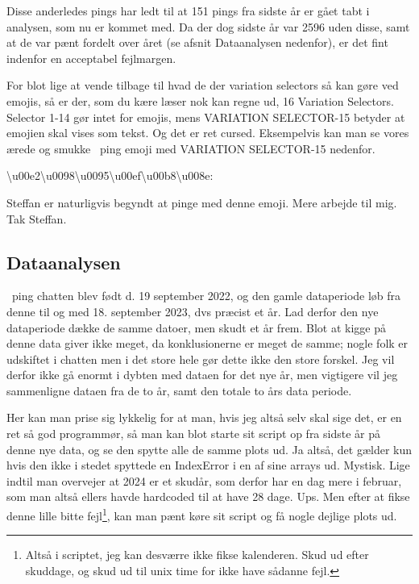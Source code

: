 \begin{article}
Disse anderledes pings har ledt til at 151 pings fra sidste år er gået tabt i analysen, som nu er kommet med. Da der dog sidste år var 2596 uden disse, samt at de var pænt fordelt over året (se afsnit Dataanalysen nedenfor), er det fint indenfor en acceptabel fejlmargen.

For blot lige at vende tilbage til hvad de der variation selectors så kan gøre ved emojis, så er der, som du kære læser nok kan regne ud, 16 Variation Selectors. Selector 1-14 gør intet for emojis, mens VARIATION SELECTOR-15 betyder at emojien skal vises som tekst. Og det er ret cursed. Eksempelvis kan man se vores ærede og smukke \coffee\ ping emoji med VARIATION SELECTOR-15 nedenfor.
\begin{center}
	\textbackslash u00e2\textbackslash u0098\textbackslash u0095\textbackslash u00ef\textbackslash u00b8\textbackslash u008e: \textcoffee
\end{center}
Steffan er naturligvis begyndt at pinge med denne emoji. Mere arbejde til mig. Tak Steffan.


\subsection*{Dataanalysen}

\coffee\ ping chatten blev født d. 19 september 2022, og den gamle dataperiode løb fra denne til og med 18. september 2023, dvs præcist et år. Lad derfor den nye dataperiode dække de samme datoer, men skudt et år frem. Blot at kigge på denne data giver ikke meget, da konklusionerne er meget de samme; nogle folk er udskiftet i chatten men i det store hele gør dette ikke den store forskel. Jeg vil derfor ikke gå enormt i dybten med dataen for det nye år, men vigtigere vil jeg sammenligne dataen fra de to år, samt den totale to års data periode.

Her kan man prise sig lykkelig for at man, hvis jeg altså selv skal sige det, er en ret så god programmør, så man kan blot starte sit script op fra sidste år på denne nye data, og se den spytte alle de samme plots ud. Ja altså, det gælder kun hvis den ikke i stedet spyttede en IndexError i en af sine arrays ud. Mystisk. Lige indtil man overvejer at 2024 er et skudår, som derfor har en dag mere i februar, som man altså ellers havde hardcoded til at have 28 dage. Ups.
Men efter at fikse denne lille bitte fejl\footnote{Altså i scriptet, jeg kan desværre ikke fikse kalenderen. Skud ud efter skuddage, og skud ud til unix time for ikke have sådanne fejl.}, kan man pænt køre sit script og få nogle dejlige plots ud.


\end{article}
